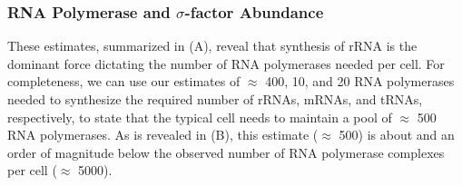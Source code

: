 \subsubsection{RNA Polymerase and $\sigma$-factor Abundance} 
These estimates, summarized in  (A), reveal that synthesis
of rRNA is the dominant force dictating the number of RNA polymerases needed
per cell. For completeness, we can use our estimates of $\approx$ 400, 10,
and 20 RNA polymerases needed to synthesize the required number of rRNAs,
mRNAs, and tRNAs, respectively, to state that the typical cell needs to
maintain a pool of $\approx$ 500 RNA polymerases. As is revealed in
 (B), this estimate ($\approx$ 500) is about and an order
of magnitude below the observed number of RNA polymerase complexes per cell
($\approx$ 5000).
